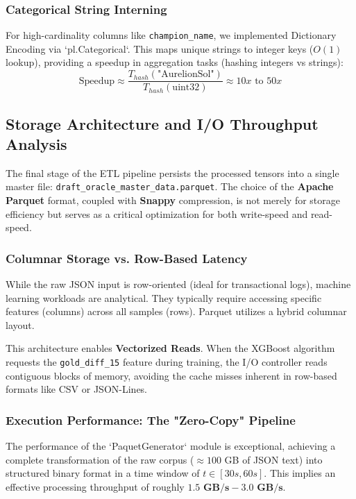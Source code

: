 \documentclass[12pt, a4paper]{article}
\begin{document}
    \subsubsection{Categorical String Interning}
    For high-cardinality columns like \texttt{champion\_name}, we implemented Dictionary Encoding via `pl.Categorical`. This maps unique strings to integer keys ($O(1)$ lookup), providing a speedup in aggregation tasks (hashing integers vs strings):
    \begin{equation}
        \text{Speedup} \approx \frac{T_{hash}(\text{"AurelionSol"})}{T_{hash}(\text{uint32})} \approx 10x \text{ to } 50x
    \end{equation}

    \subsection{Storage Architecture and I/O Throughput Analysis}
    The final stage of the ETL pipeline persists the processed tensors into a single master file: \texttt{draft\_oracle\_master\_data.parquet}. The choice of the \textbf{Apache Parquet} format, coupled with \textbf{Snappy} compression, is not merely for storage efficiency but serves as a critical optimization for both write-speed and read-speed.

    \subsubsection{Columnar Storage vs. Row-Based Latency}
    While the raw JSON input is row-oriented (ideal for transactional logs), machine learning workloads are analytical. They typically require accessing specific features (columns) across all samples (rows). Parquet utilizes a hybrid columnar layout.

    This architecture enables \textbf{Vectorized Reads}. When the XGBoost algorithm requests the \texttt{gold\_diff\_15} feature during training, the I/O controller reads contiguous blocks of memory, avoiding the cache misses inherent in row-based formats like CSV or JSON-Lines.

    \subsubsection{Execution Performance: The "Zero-Copy" Pipeline}
    The performance of the `PaquetGenerator` module is exceptional, achieving a complete transformation of the raw corpus ($\approx 100$ GB of JSON text) into structured binary format in a time window of $t \in [30s, 60s]$. This implies an effective processing throughput of roughly $\mathbf{1.5 \text{ GB/s} - 3.0 \text{ GB/s}}$.
\end{document}

